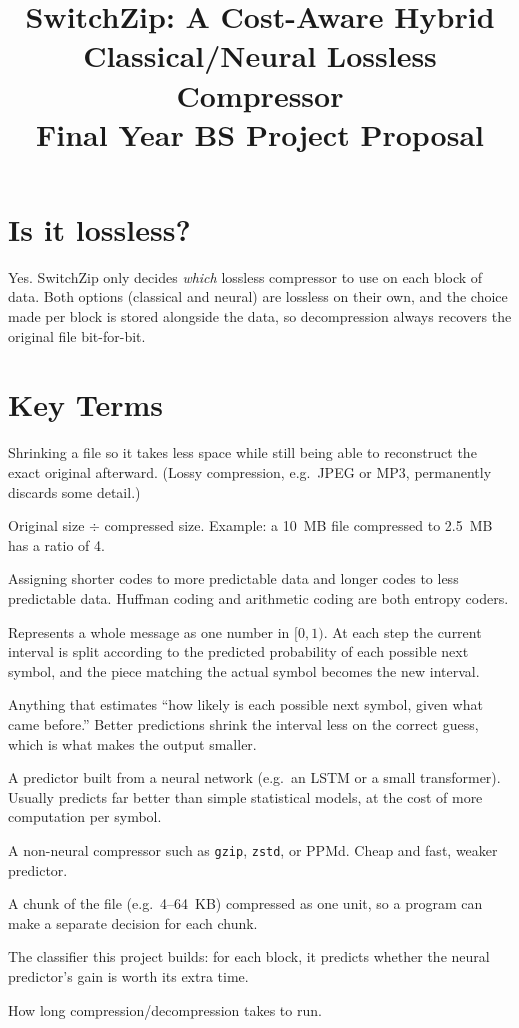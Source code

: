 \documentclass[11pt]{article}
\title{\textbf{SwitchZip: A Cost-Aware Hybrid Classical/Neural Lossless Compressor}\\
\large Final Year BS Project Proposal}
\author{}
\date{}
\begin{document}
\maketitle

\section*{Is it lossless?}
Yes. SwitchZip only decides \emph{which} lossless compressor to use on each
block of data. Both options (classical and neural) are lossless on their
own, and the choice made per block is stored alongside the data, so
decompression always recovers the original file bit-for-bit.

\section{Key Terms}
\begin{description}[leftmargin=1.2cm, style=nextline]
  \item[Lossless compression] Shrinking a file so it takes less space while
  still being able to reconstruct the exact original afterward. (Lossy
  compression, e.g.\ JPEG or MP3, permanently discards some detail.)
  \item[Compression ratio] Original size $\div$ compressed size. Example:
  a 10~MB file compressed to 2.5~MB has a ratio of 4.
  \item[Entropy coding] Assigning shorter codes to more predictable data
  and longer codes to less predictable data. Huffman coding and arithmetic
  coding are both entropy coders.
  \item[Arithmetic coding] Represents a whole message as one number in
  $[0,1)$. At each step the current interval is split according to the
  predicted probability of each possible next symbol, and the piece
  matching the actual symbol becomes the new interval.
  \item[Predictor] Anything that estimates ``how likely is each possible
  next symbol, given what came before.'' Better predictions shrink the
  interval less on the correct guess, which is what makes the output
  smaller.
  \item[Neural predictor] A predictor built from a neural network (e.g.\ an
  LSTM or a small transformer). Usually predicts far better than simple
  statistical models, at the cost of more computation per symbol.
  \item[Classical compressor] A non-neural compressor such as
  \texttt{gzip}, \texttt{zstd}, or PPMd. Cheap and fast, weaker predictor.
  \item[Block] A chunk of the file (e.g.\ 4--64~KB) compressed as one unit,
  so a program can make a separate decision for each chunk.
  \item[Gatekeeper] The classifier this project builds: for each block, it
  predicts whether the neural predictor's gain is worth its extra time.
  \item[Latency] How long compression/decompression takes to run.
\end{description}
\end{document}
